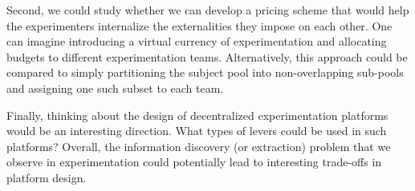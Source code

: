 \documentclass[12pt]{article}
\begin{document}
Second, we could study whether we can develop a pricing scheme that would help the experimenters internalize the externalities they impose on each other. One can imagine introducing a virtual currency of experimentation and allocating budgets to different experimentation teams. Alternatively, this approach could be compared to simply partitioning the subject pool into non-overlapping sub-pools and assigning one such subset to each team. 

Finally, thinking about the design of decentralized experimentation platforms would be an interesting direction. What types of levers could be used in such platforms? Overall, the information discovery (or extraction) problem that we observe in experimentation could potentially lead to interesting trade-offs in platform design.
\end{document}
